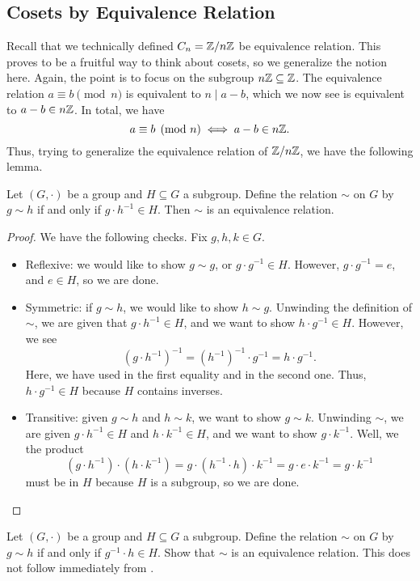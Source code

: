 \documentclass[../main.tex]{subfiles}
\begin{document}
\subsection{Cosets by Equivalence Relation}
Recall that we technically defined $C_n=\mathbb Z/n\mathbb Z$ be equivalence relation. This proves to be a fruitful way to think about cosets, so we generalize the notion here. Again, the point is to focus on the subgroup $n\mathbb Z\subseteq\mathbb Z$. The equivalence relation $a\equiv b\pmod n$ is equivalent to $n\mid a-b$, which we now see is equivalent to $a-b\in n\mathbb Z$. In total, we have
\[a\equiv b\pmod n\iff a-b\in n\mathbb Z.\]
Thus, trying to generalize the equivalence relation of $\mathbb Z/n\mathbb Z$, we have the following lemma.
\begin{lemma} \label{lem:r-coset-equiv}
    Let $(G,\cdot)$ be a group and $H\subseteq G$ a subgroup. Define the relation $\sim$ on $G$ by $g\sim h$ if and only if $g\cdot h^{-1}\in H$. Then $\sim$ is an equivalence relation.
\end{lemma}
\begin{proof}
    We have the following checks. Fix $g,h,k\in G$.
    \begin{itemize}
        \item Reflexive: we would like to show $g\sim g$, or $g\cdot g^{-1}\in H$. However, $g\cdot g^{-1}=e$, and $e\in H$, so we are done.
        \item Symmetric: if $g\sim h$, we would like to show $h\sim g$. Unwinding the definition of $\sim$, we are given that $g\cdot h^{-1}\in H$, and we want to show $h\cdot g^{-1}\in H$. However, we see
        \[\left(g\cdot h^{-1}\right)^{-1}=\left(h^{-1}\right)^{-1}\cdot g^{-1}=h\cdot g^{-1}.\]
        Here, we have used  in the first equality and  in the second one. Thus, $h\cdot g^{-1}\in H$ because $H$ contains inverses.
        \item Transitive: given $g\sim h$ and $h\sim k$, we want to show $g\sim k$. Unwinding $\sim$, we are given $g\cdot h^{-1}\in H$ and $h\cdot k^{-1}\in H$, and we want to show $g\cdot k^{-1}$. Well, we the product
        \[\left(g\cdot h^{-1}\right)\cdot\left(h\cdot k^{-1}\right)=g\cdot \left(h^{-1}\cdot h\right)\cdot k^{-1}=g\cdot e\cdot k^{-1}=g\cdot k^{-1}\]
        must be in $H$ because $H$ is a subgroup, so we are done.
        \qedhere
    \end{itemize}
\end{proof}
\begin{exe} \label{exe:l-coset-equiv}
    Let $(G,\cdot)$ be a group and $H\subseteq G$ a subgroup. Define the relation $\sim$ on $G$ by $g\sim h$ if and only if $g^{-1}\cdot h\in H$. Show that $\sim$ is an equivalence relation. This does not follow immediately from .
\end{exe}
\end{document}
